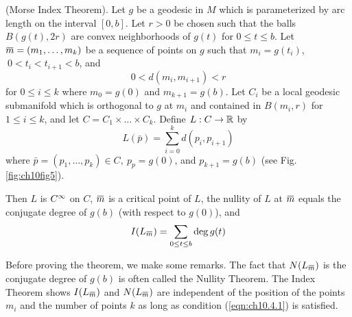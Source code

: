 \documentclass[../main]{subfiles}
\begin{document}
\begin{theorem} \label{thm:ch10.4.2}
(Morse Index Theorem). Let $g$ be a geodesic in $M$ which is parameterized by arc length on the interval $[0,b]$. Let $r>0$ be chosen such that the balls $B(g(t),2r)$ are convex neighborhoods of $g(t)$ for $0\le t\le b$. Let $\xoverline m=(m_1,\ldots,m_k)$ be a sequence of points on $g$ such that $m_i=g(t_i)$,\newline $~0<t_i<t_{i+1}<b$, and
\begin{equation}\tag{10}\label{eqn:ch10.4.1}
0 < d(m_i,m_{i+1}) < r
\end{equation}
for $0\le i\le k$ where $m_0=g(0)$ and $m_{k+1}=g(b)$. Let $C_i$ be a local geodesic submanifold which is orthogonal to $g$ at $m_i$ and contained in $B(m_i,r)$ for \newline $1\le i\le k$, and let $C=C_1\times\ldots\times C_k$. Define $L:C\to\mathbb{R}$ by
\[L(\bar p) = \sum_{i=0}^k d(p_i,p_{i+1})\]
where $\bar p=(p_1,\ldots,p_k)\in C,~p_p=g(0)$, and $p_{k+1}=g(b)$ (see Fig. \ref{fig:ch10fig5}).

Then $L$ is $C^\infty$ on $C$, $\xoverline m$ is a critical point of $L$, the nullity of $L$ at $\xoverline m$ equals the conjugate degree of $g(b)$ (with respect to $g(0)$), and
\[I(L_{\xoverline m}) = \sum_{0\le t\le b}\deg g(t)\]
\end{theorem}


Before proving the theorem, we make some remarks. The fact that $N(L_{\xoverline m})$ is the conjugate degree of $g(b)$ is often called the Nullity Theorem. The Index Theorem shows $I(L_{\xoverline m})$ and $N(L_{\xoverline m})$ are independent of the position of the points $m_i$ and the number of points $k$ as long as condition (\ref{eqn:ch10.4.1}) is satisfied.
\end{document}
